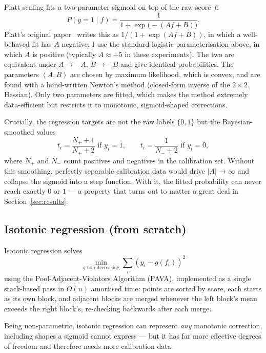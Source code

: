 \documentclass[11pt,a4paper]{article}
\begin{document}
Platt scaling fits a two-parameter sigmoid on top of the raw score $f$:
\begin{equation}
P(y=1 \mid f) = \frac{1}{1 + \exp\!\big(-(Af + B)\big)} .
\end{equation}
Platt's original paper~\cite{platt1999} writes this as $1/(1+\exp(Af+B))$, in which a well-behaved fit
has $A$ negative; I use the standard logistic parameterisation above, in which $A$ is positive (typically
$A \approx +5$ in these experiments). The two are equivalent under $A \to -A$, $B \to -B$ and give
identical probabilities.
The parameters $(A,B)$ are chosen by maximum likelihood, which is convex, and are found with a
hand-written Newton's method (closed-form inverse of the $2\times2$ Hessian). Only two parameters are
fitted, which makes the method extremely data-efficient but restricts it to monotonic, sigmoid-shaped
corrections.

Crucially, the regression targets are not the raw labels $\{0,1\}$ but the Bayesian-smoothed values
\begin{equation}
t_i = \frac{N_+ + 1}{N_+ + 2} \text{ if } y_i = 1, \qquad
t_i = \frac{1}{N_- + 2} \text{ if } y_i = 0 ,
\end{equation}
where $N_+$ and $N_-$ count positives and negatives in the calibration set. Without this smoothing,
perfectly separable calibration data would drive $|A| \to \infty$ and collapse the sigmoid into a step
function. With it, the fitted probability can never reach exactly $0$ or $1$ --- a property that turns out
to matter a great deal in Section~\ref{sec:results}.

\subsection{Isotonic regression (from scratch)}

Isotonic regression solves
\begin{equation}
\min_{g \text{ non-decreasing}} \sum_i \left( y_i - g(f_i) \right)^2
\end{equation}
using the Pool-Adjacent-Violators Algorithm (PAVA), implemented as a single stack-based pass in $O(n)$
amortised time: points are sorted by score, each starts as its own block, and adjacent blocks are merged
whenever the left block's mean exceeds the right block's, re-checking backwards after each merge.

Being non-parametric, isotonic regression can represent \emph{any} monotonic correction, including shapes
a sigmoid cannot express --- but it has far more effective degrees of freedom and therefore needs more
calibration data.
\end{document}
